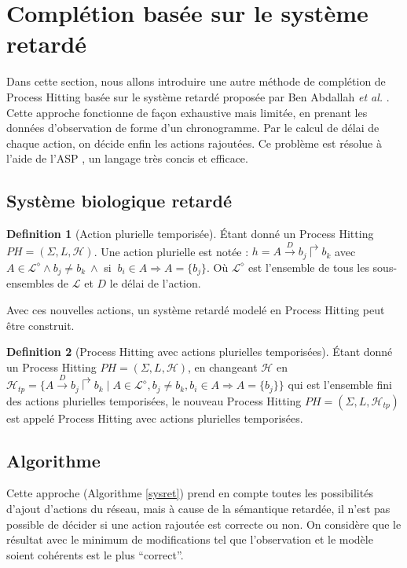 \documentclass[11pt]{report}
\theoremstyle{definition}
\newtheorem{Def}{Definition}[chapter]
\begin{document}
\section{Compl\'etion bas\'ee sur le syst\`eme retard\'e}
Dans cette section, nous allons introduire une autre m\'ethode de compl\'etion de Process Hitting bas\'ee sur le syst\`eme retard\'e propos\'ee par Ben Abdallah \textit{et al.} \citep{Abdallah2014,Abdallah2015}. Cette approche fonctionne de fa\c con exhaustive mais limit\'ee, en prenant les donn\'ees d'observation de forme d'un chronogramme. Par le calcul de d\'elai de chaque action, on d\'ecide enfin les actions rajout\'ees. Ce probl\`eme est r\'esolue \`a l'aide de l'ASP \citep{Baral2003}, un langage tr\`es concis et efficace. 

\subsection{Syst\`eme biologique retard\'e}
\begin{Def}[Action plurielle temporis\'ee]
\'Etant donn\'e un Process Hitting $PH=(\Sigma,L,\mathcal{H})$. Une action plurielle est not\'ee : $h=A\stackrel{D}{\to}b_j\Rsh b_k$ avec $A\in \mathcal{L}^{\diamond}\land b_j\neq b_k\ \land$ si $\ b_i\in A\Rightarrow A=\{b_j\}$. O\`u $\mathcal{L}^{\diamond}$ est l'ensemble de tous les sous-ensembles de $\mathcal{L}$ et $D$ le d\'elai de l'action.
\end{Def}
Avec ces nouvelles actions, un syst\`eme retard\'e model\'e en Process Hitting peut \^etre construit. 
\begin{Def}[Process Hitting avec actions plurielles temporis\'ees]
\'Etant donn\'e un Process Hitting $PH=(\Sigma,L,\mathscr{H})$, en changeant $\mathscr{H}$ en $\mathscr{H}_{tp}=\{A\stackrel{D}{\to}b_j\Rsh b_k\mid A\in\mathcal{L}^{\diamond},b_j\neq b_k,b_i\in A\Rightarrow A=\{b_j\}\}$ qui est l'ensemble fini des actions plurielles temporis\'ees, le nouveau Process Hitting $PH=(\Sigma,L,\mathscr{H}_{tp})$ est appel\'e Process Hitting avec actions plurielles temporis\'ees.
\end{Def}
\subsection{Algorithme}

Cette approche (Algorithme \ref{sysret}) prend en compte toutes les possibilit\'es d'ajout d'actions du r\'eseau, mais \`a cause de la s\'emantique retard\'ee, il n'est pas possible de d\'ecider si une action rajout\'ee est correcte ou non. On consid\`ere que le r\'esultat avec le minimum de modifications tel que l'observation et le mod\`ele soient coh\'erents est le plus ``correct''. 
\end{document}
